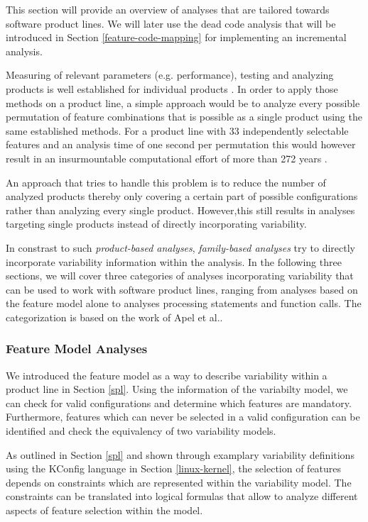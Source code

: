 \documentclass[a4paper]{article}
\begin{document}
This section will provide an overview of analyses that are tailored towards software product lines. We will later use the dead code analysis that will be introduced in Section \ref{feature-code-mapping}  for implementing an incremental analysis.

Measuring of relevant parameters (e.g. performance), testing and analyzing products is well established for individual products \cite[p.243]{Apel:2013:FSP:2541773}. 
In order to apply those methods on a product line, a simple approach would be to analyze every possible permutation of feature combinations that is possible as a single product using the same established methods. For a product line with 33 independently selectable features and an analysis time of one second per permutation this would however result in an insurmountable computational effort of more than 272 years \cite{Thum:2014:CSA:2620784.2580950}. 

An approach that tries to handle this problem is to reduce the number of analyzed products thereby only covering a certain part of possible configurations rather than analyzing every single product. However,this still results in analyses targeting single products instead of directly incorporating variability. 

In constrast to such \emph{product-based analyses}, \emph{family-based analyses} try to directly incorporate variability information within the analysis. In the following three sections, we will cover three categories of analyses incorporating variability that can be used to work with software product lines, ranging from analyses based on the feature model alone  to analyses processing statements and function calls. The categorization is based on the work of Apel et al.\cite{Apel:2013:FSP:2541773}.

\subsubsection{Feature Model Analyses}

We introduced the feature model as a way to describe variability within a product line in Section \ref{spl}. Using the information of the variabilty model, we can check for valid configurations and determine which features are mandatory.
Furthermore, features which can never be selected in a valid configuration can be identified and check the equivalency of two variability models.

As outlined in Section \ref{spl} and shown through examplary variability definitions using the KConfig language in Section \ref{linux-kernel}, the selection of features depends on constraints which are represented within the variability model. The constraints can be translated into logical formulas that allow to analyze different aspects of feature selection within the model.
\end{document}
